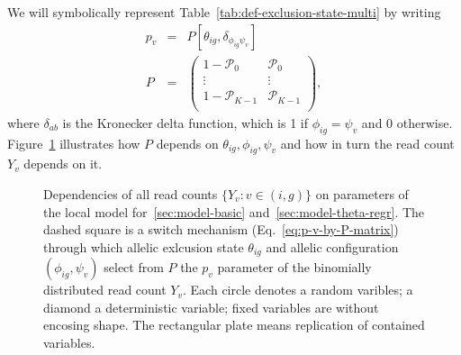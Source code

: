 \documentclass[letterpaper]{article}
\begin{document}
We will symbolically represent Table~\ref{tab:def-exclusion-state-multi} by writing
\begin{eqnarray}
\label{eq:p-v-by-P-matrix}
p_v &=& P[\theta_{ig},\delta_{\phi_{ig}\psi_v}] \\
\label{eq:P-matrix}
P &=&
\begin{pmatrix}
1-\mathcal{P}_0 & \mathcal{P}_0 \\
\vdots & \vdots \\
1-\mathcal{P}_{K-1} & \mathcal{P}_{K-1} \\
\end{pmatrix},
\end{eqnarray}
where \(\delta_{ab}\) is
the Kronecker delta function, which is 1 if \(\phi_{ig}=\psi_v\) and 0
otherwise.  Figure~\ref{fig:plate-local} illustrates how \(P\) depends on
\(\theta_{ig}, \phi_{ig}, \psi_v\) and how in turn the read count \(Y_v\)
depends on it.

\begin{figure}[t]

\begin{center}
\end{center}
\caption{
Dependencies of all read counts \(\{Y_v : v\in(i,g)\}\) on parameters of the
local model for~\ref{sec:model-basic} and~\ref{sec:model-theta-regr}.  The
dashed square is a switch mechanism (Eq.~\ref{eq:p-v-by-P-matrix}) through
which allelic exlcusion state \(\theta_{ig}\) and allelic configuration
\((\phi_{ig},\psi_v)\) select from \(P\) the \(p_v\) parameter of the
binomially distributed read count \(Y_v\).  Each circle denotes a random
varibles; a diamond a deterministic variable; fixed variables are without
encosing shape.  The rectangular plate means replication of contained
variables.
}
\label{fig:plate-local}
\end{figure}
\end{document}

